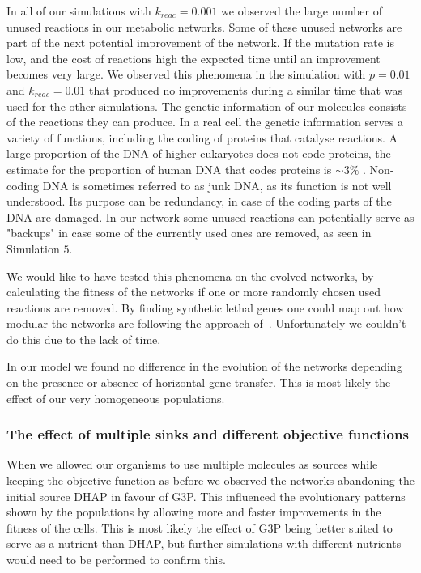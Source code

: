 \documentclass[a4paper,12pt]{article}
\begin{document}
In all of our simulations with $k_{reac}=0.001$ we observed the large number of unused reactions in our metabolic networks. Some of these unused networks are part of the next potential improvement of the network. If the mutation rate is low, and the cost of reactions high the expected time until an improvement becomes very large. We observed this phenomena in the simulation with $p=0.01$ and $k_{reac}=0.01$ that produced no improvements during a similar time that was used for the other simulations. The genetic information of our molecules consists of the reactions they can produce. In a real cell the genetic information serves a variety of functions, including the coding of proteins that catalyse reactions. A large proportion of the DNA of higher eukaryotes does not code proteins, the estimate for the proportion of human DNA that codes proteins is $\sim 3\%$ \cite{junkdna}. Non-coding DNA is sometimes referred to as junk DNA, as its function is not well understood. Its purpose can be redundancy, in case of the coding parts of the DNA are damaged. In our network some unused reactions can potentially serve as "backups" in case some of the currently used ones are removed, as seen in Simulation $5$. 

We would like to have tested this phenomena on the evolved networks, by calculating the fitness of the networks if one or more randomly chosen used reactions are removed. By finding synthetic lethal genes one could map out how modular the networks are following the approach of~\cite{evolutioncomplex}. Unfortunately we couldn't do this due to the lack of time.

In our model we found no difference in the evolution of the networks depending on the presence or absence of horizontal gene transfer. This is most likely the effect of our very homogeneous populations. 

\subsubsection*{The effect of multiple sinks and different objective functions}
\label{sub:the_effect_of_multiple_sinks}

When we allowed our organisms to use multiple molecules as sources while keeping the objective function as before we observed the networks abandoning the initial source DHAP in favour of G3P. This influenced the evolutionary patterns shown by the populations by allowing more and faster improvements in the fitness of the cells. This is most likely the effect of G3P being better suited to serve as a nutrient than DHAP, but further simulations with different nutrients would need to be performed to confirm this.
\end{document}
